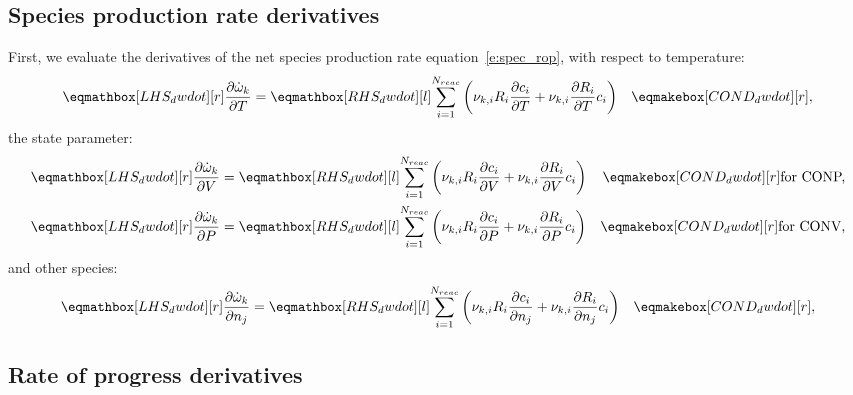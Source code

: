 \documentclass[12pt,number,sort&compress]{elsarticle}
\newcommand{\nr}{N_{reac}}
\newcommand{\conp}{CONP}
\newcommand{\conv}{CONV}
\newcommand{\dconp}{\ifmmode\text{for \conp,}\else for \conp,\fi}
\newcommand{\dconv}{\ifmmode\text{for \conv,}\else for \conv,\fi}
\begin{document}
\subsection{Species production rate derivatives}
\label{s:d_spec_prod}
First, we evaluate the derivatives of the net species production rate equation~\cref{e:spec_rop}, with respect to temperature:
\begin{align}
 \label{e:dwdot_dT}
 \lhs{dwdot}{\frac{\partial \dot{\omega}_{k} }{\partial T }} &= \rhs{dwdot}{\sum_{i=1}^{\nr} \left(\nu_{k,i} R_{i} \frac{\partial c_{i}}{\partial T } + \nu_{k,i} \frac{\partial R_{i}}{\partial T } c_{i}\right)} & \cond{dwdot}{,}
\end{align}
the state parameter:
\begin{subequations}
 \label{e:dwdot_de}
 \begin{align}
  \lhs{dwdot}{\frac{\partial \dot{\omega}_{k} }{\partial V }} &= \rhs{dwdot}{\sum_{i=1}^{\nr} \left(\nu_{k,i} R_{i} \frac{\partial c_{i}}{\partial V } + \nu_{k,i} \frac{\partial R_{i}}{\partial V } c_{i}\right)} & \cond{dwdot}{\dconp}\\
  \lhs{dwdot}{\frac{\partial \dot{\omega}_{k} }{\partial P }} &= \rhs{dwdot}{\sum_{i=1}^{\nr} \left(\nu_{k,i} R_{i} \frac{\partial c_{i}}{\partial P } + \nu_{k,i} \frac{\partial R_{i}}{\partial P } c_{i}\right)} & \cond{dwdot}{\dconv}
 \end{align}
\end{subequations}
and other species:
\begin{align}
 \label{e:dwdot_dnj}
 \lhs{dwdot}{\frac{\partial \dot{\omega}_{k} }{\partial {n_j} }} &= \rhs{dwdot}{\sum_{i=1}^{\nr} \left(\nu_{k,i} R_{i} \frac{\partial c_{i} }{\partial {n_j} } + \nu_{k,i} \frac{\partial R_{i} }{\partial {n_j} } c_{i}\right)} & \cond{dwdot}{,}
\end{align}

\subsection{Rate of progress derivatives}
\end{document}
